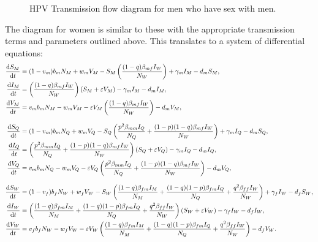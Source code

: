 \documentclass[12pt]{article}
\begin{document}
%
\begin{figure}[h!]
\begin{center}
\end{center}
\caption{HPV Transmission flow diagram for men who have sex with men.}
\label{fig:flowQueer}
\end{figure}
The diagram for women is similar to these with the appropriate transmission terms and parameters outlined above. This translates to a system of differential equations:
\begin{align}
\frac{\mathrm{d}S_M}{\mathrm{d}t}&=(1-v_m)b_mN_M + w_mV_M - S_M\left(\frac{(1-q)\beta_{mf}I_W}{N_W}\right) + \gamma_mI_M - d_mS_M,\\
\frac{\mathrm{d}I_M}{\mathrm{d}t}&=\left(\frac{(1-q)\beta_{mf}I_W}{N_W}\right)(S_M+\varepsilon V_M)-\gamma_mI_M - d_mI_M,\\
\frac{\mathrm{d}V_M}{\mathrm{d}t}&=v_mb_mN_M - w_mV_M - \varepsilon V_M\left(\frac{(1-q)\beta_{mf}I_W}{N_W}\right) - d_mV_M,\\[2ex]
\frac{\mathrm{d}S_Q}{\mathrm{d}t}&=(1-v_m)b_mN_Q + w_mV_Q - S_Q\left(\frac{p^2\beta_{mm}I_Q}{N_Q}+\frac{(1-p)(1-q)\beta_{mf}I_W}{N_W}\right) + \gamma_mI_Q - d_mS_Q,\\
\frac{\mathrm{d}I_Q}{\mathrm{d}t}&=\left(\frac{p^2\beta_{mm}I_Q}{N_Q}+\frac{(1-p)(1-q)\beta_{mf}I_W}{N_W}\right)(S_Q+\varepsilon V_Q)-\gamma_mI_Q - d_mI_Q,\\
\frac{\mathrm{d}V_Q}{\mathrm{d}t}&=v_mb_mN_Q - w_mV_Q - \varepsilon V_Q\left(\frac{p^2\beta_{mm}I_Q}{N_Q}+\frac{(1-p)(1-q)\beta_{mf}I_W}{N_W}\right) - d_mV_Q,\\[2ex]
\frac{\mathrm{d}S_W}{\mathrm{d}t}&=(1-v_f)b_fN_W + w_fV_W - S_W\left(\frac{(1-q)\beta_{fm}I_M}{N_M}+\frac{(1-q)(1-p)\beta_{fm}I_Q}{N_Q}+\frac{q^2\beta_{ff}I_W}{N_W}\right) + \gamma_fI_W - d_fS_W,\\
\frac{\mathrm{d}I_W}{\mathrm{d}t}&=\left(\frac{(1-q)\beta_{fm}I_M}{N_M}+\frac{(1-q)(1-p)\beta_{fm}I_Q}{N_Q}+\frac{q^2\beta_{ff}I_W}{N_W}\right)(S_W+\varepsilon V_W)-\gamma_fI_W - d_fI_W,\\
\frac{\mathrm{d}V_W}{\mathrm{d}t}&=v_fb_fN_W - w_fV_W - \varepsilon V_W\left(\frac{(1-q)\beta_{fm}I_M}{N_M}+\frac{(1-q)(1-p)\beta_{fm}I_Q}{N_Q}+\frac{q^2\beta_{ff}I_W}{N_W}\right) - d_fV_W.
\end{align}
\end{document}
